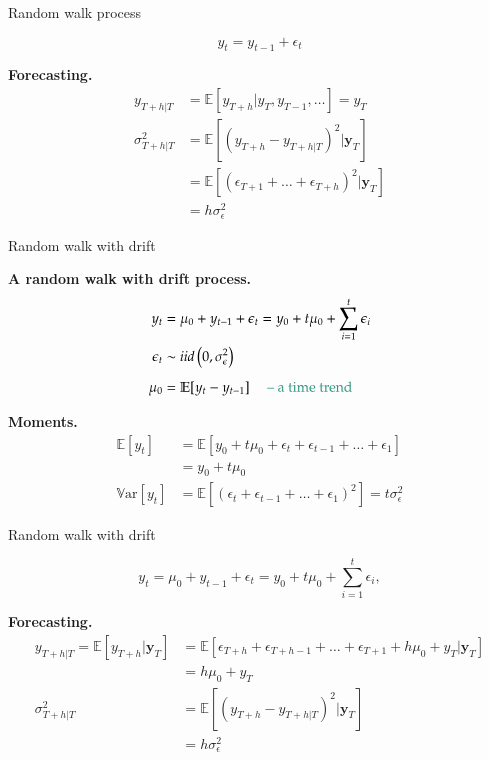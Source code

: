 \documentclass[notes,blackandwhite,mathsans]{beamer}
\begin{document}
\begin{frame}{Random walk process }

$$ y_t = y_{t-1} + \epsilon_{t} $$

\bigskip\textbf{Forecasting.}
\begin{align*}
y_{T+h|T} &= \mathbb{E}[y_{T+h}| y_T, y_{T-1}, \dots] = y_{T} \\[2ex]
\sigma^2_{T+h|T} &= \mathbb{E}\left[(y_{T+h} - y_{T+h|T})^2|\mathbf{y}_T\right]\\
&= \mathbb{E}\left[(\epsilon_{T+1}+ \dots + \epsilon_{T+h})^2|\mathbf{y}_T\right]\\
&= h\sigma_\epsilon^2 
\end{align*}

\end{frame}




\begin{frame}{Random walk with drift}

\textbf{A random walk with drift process.}
\begin{align*}
y_t &= \mu_0 + y_{t-1} + \epsilon_t = y_0 + t\mu_0 + \sum_{i=1}^{t} \epsilon_i\\
\epsilon_t &\sim iid\left(0,\sigma_{\epsilon}^2\right)\\[1ex]
\mu_0 &= \mathbb{E}[y_t - y_{t-1}] \quad\text{ {\color{mcxs2}-- a time trend}}
\end{align*}



\bigskip\textbf{Moments.}
\begin{align*}
\mathbb{E}[y_t] &= \mathbb{E}\left[ y_0 + t\mu_0 + \epsilon_t + \epsilon_{t-1} + \dots + \epsilon_1 \right] \\
&= y_0 + t\mu_0\\
\mathbb{V}\text{ar}[y_t] &= \mathbb{E}\left[(\epsilon_t + \epsilon_{t-1} + \dots + \epsilon_1)^2 \right] = t\sigma_\epsilon^2
\end{align*}

\end{frame}




\begin{frame}{Random walk with drift}

$$ y_t = \mu_0 + y_{t-1} + \epsilon_t = y_0 + t\mu_0 + \sum_{i=1}^{t} \epsilon_i, $$

\bigskip\textbf{Forecasting.}\small
\begin{align*}
y_{T+h|T} = \mathbb{E}[y_{T+h}|\mathbf{y}_T] &= \mathbb{E}[\epsilon_{T+h} + \epsilon_{T+h-1}+\dots + \epsilon_{T+1} + h\mu_0 + y_{T}|\mathbf{y}_T] \\
&=  h\mu_0 + y_T  \\[1ex]
\sigma^2_{T+h|T} &= \mathbb{E}\left[(y_{T+h} - y_{T+h|T})^2|\mathbf{y}_T\right] \\
&= h\sigma_\epsilon^2
\end{align*}

\end{frame}
\end{document}

